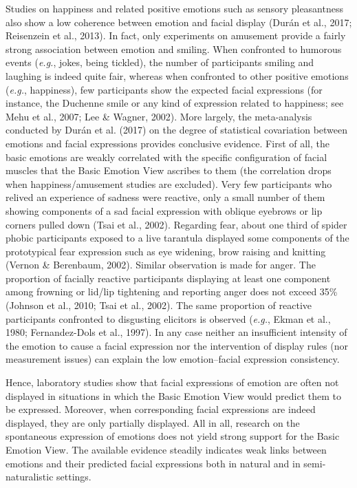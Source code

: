 \documentclass[
  english,
  doc]{apa7}
\begin{document}
Studies on happiness and related positive emotions such as sensory pleasantness also show a low coherence between emotion and facial display (Durán et al., 2017; Reisenzein et al., 2013). In fact, only experiments on amusement provide a fairly strong association between emotion and smiling. When confronted to humorous events (\emph{e.g.}, jokes, being tickled), the number of participants smiling and laughing is indeed quite fair, whereas when confronted to other positive emotions (\emph{e.g.}, happiness), few participants show the expected facial expressions (for instance, the Duchenne smile or any kind of expression related to happiness; see Mehu et al., 2007; Lee \& Wagner, 2002). More largely, the meta-analysis conducted by Durán et al. (2017) on the degree of statistical covariation between emotions and facial expressions provides conclusive evidence. First of all, the basic emotions are weakly correlated with the specific configuration of facial muscles that the Basic Emotion View ascribes to them (the correlation drops when happiness/amusement studies are excluded). Very few participants who relived an experience of sadness were reactive, only a small number of them showing components of a sad facial expression with oblique eyebrows or lip corners pulled down (Tsai et al., 2002). Regarding fear, about one third of spider phobic participants exposed to a live tarantula displayed some components of the prototypical fear expression such as eye widening, brow raising and knitting (Vernon \& Berenbaum, 2002). Similar observation is made for anger. The proportion of facially reactive participants displaying at least one component among frowning or lid/lip tightening and reporting anger does not exceed 35\% (Johnson et al., 2010; Tsai et al., 2002). The same proportion of reactive participants confronted to disgusting elicitors is observed (\emph{e.g.}, Ekman et al., 1980; Fernandez-Dols et al., 1997). In any case neither an insufficient intensity of the emotion to cause a facial expression nor the intervention of display rules (nor measurement issues) can explain the low emotion--facial expression consistency.

Hence, laboratory studies show that facial expressions of emotion are often not displayed in situations in which the Basic Emotion View would predict them to be expressed. Moreover, when corresponding facial expressions are indeed displayed, they are only partially displayed. All in all, research on the spontaneous expression of emotions does not yield strong support for the Basic Emotion View. The available evidence steadily indicates weak links between emotions and their predicted facial expressions both in natural and in semi-naturalistic settings.
\end{document}
